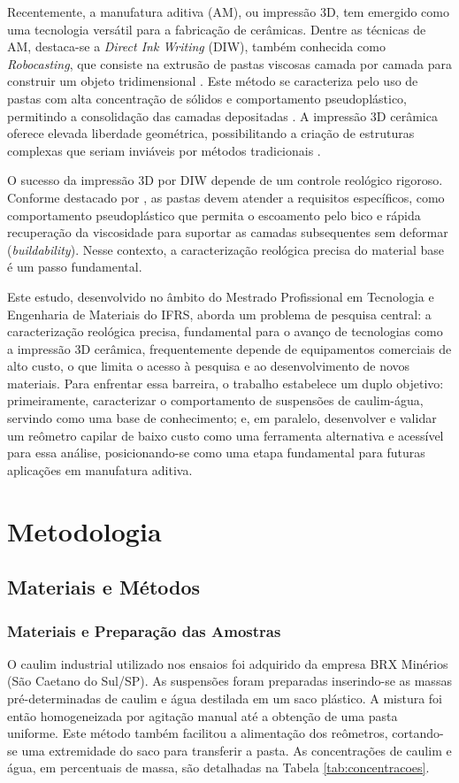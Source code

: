 \documentclass[article,12pt,oneside,a4paper,english,brazil,sumario=tradicional]{abntex2}
\begin{document}
Recentemente, a manufatura aditiva (AM), ou impressão 3D, tem emergido como uma tecnologia versátil para a fabricação de cerâmicas. Dentre as técnicas de AM, destaca-se a \textit{Direct Ink Writing} (DIW), também conhecida como \textit{Robocasting}, que consiste na extrusão de pastas viscosas camada por camada para construir um objeto tridimensional . Este método se caracteriza pelo uso de pastas com alta concentração de sólidos e comportamento pseudoplástico, permitindo a consolidação das camadas depositadas . A impressão 3D cerâmica oferece elevada liberdade geométrica, possibilitando a criação de estruturas complexas que seriam inviáveis por métodos tradicionais .

O sucesso da impressão 3D por DIW depende de um controle reológico rigoroso. Conforme destacado por , as pastas devem atender a requisitos específicos, como comportamento pseudoplástico que permita o escoamento pelo bico e rápida recuperação da viscosidade para suportar as camadas subsequentes sem deformar (\textit{buildability}). Nesse contexto, a caracterização reológica precisa do material base é um passo fundamental.

Este estudo, desenvolvido no âmbito do Mestrado Profissional em Tecnologia e Engenharia de Materiais do IFRS, aborda um problema de pesquisa central: a caracterização reológica precisa, fundamental para o avanço de tecnologias como a impressão 3D cerâmica, frequentemente depende de equipamentos comerciais de alto custo, o que limita o acesso à pesquisa e ao desenvolvimento de novos materiais. Para enfrentar essa barreira, o trabalho estabelece um duplo objetivo: primeiramente, caracterizar o comportamento de suspensões de caulim-água, servindo como uma base de conhecimento; e, em paralelo, desenvolver e validar um reômetro capilar de baixo custo como uma ferramenta alternativa e acessível para essa análise, posicionando-se como uma etapa fundamental para futuras aplicações em manufatura aditiva.

\section{Metodologia}
\label{sec:experimental}

\subsection{Materiais e Métodos}
\subsubsection{Materiais e Preparação das Amostras}
O caulim industrial utilizado nos ensaios foi adquirido da empresa BRX Minérios (São Caetano do Sul/SP). As suspensões foram preparadas inserindo-se as massas pré-determinadas de caulim e água destilada em um saco plástico. A mistura foi então homogeneizada por agitação manual até a obtenção de uma pasta uniforme. Este método também facilitou a alimentação dos reômetros, cortando-se uma extremidade do saco para transferir a pasta. As concentrações de caulim e água, em percentuais de massa, são detalhadas na Tabela \ref{tab:concentracoes}.
\end{document}

